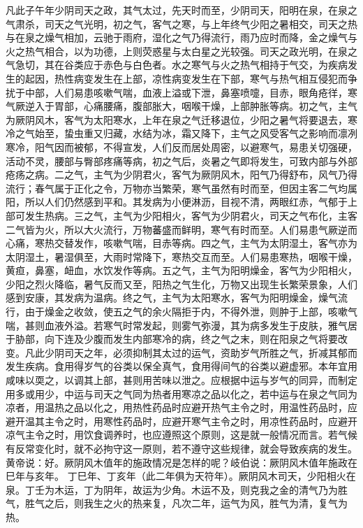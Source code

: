 \documentclass[12pt,UTF8]{ctexbook}
\begin{document}
凡此子午年少阴司天之政，其气太过，先天时而至，少阴司天，阳明在泉，在泉之气肃杀，司天之气光明，初之气，客气之寒，与上年终气少阳之暑相交，司天之热与在泉之燥气相加，云驰于雨府，湿化之气乃得流行，雨乃应时而降，金之燥气与火之热气相合，以为功德，上则荧惑星与太白星之光较强。司天之政光明，在泉之气急切，其在谷类应于赤色与白色者。水之寒气与火之热气相持于气交，为疾病发生的起因，热性病变发生在上部，凉性病变发生在下部，寒气与热气相互侵犯而争扰于中部，人们易患咳嗽气喘，血液上溢或下泄，鼻塞喷嚏，目赤，眼角疮徉，寒气厥逆入于胃部，心痛腰痛，腹部胀大，咽喉干燥，上部肿胀等病。初之气，主气为厥阴风木，客气为太阳寒水，上年在泉之气迁移退位，少阳之暑气将要退去，寒冷之气始至，蛰虫重又归藏，水结为冰，霜又降下，主气之风受客气之影响而凛冽寒冷，阳气因而被郁，不得宣发，人们反而居处周密，以避寒气，易患关切强硬，活动不灵，腰部与臀部疼痛等病，初之气后，炎暑之气即将发生，可致内部与外部疮疡之病。二之气，主气为少阴君火，客气为厥阴风木，阳气乃得舒布，风气乃得流行；春气属于正化之令，万物亦当繁荣，寒气虽然有时而至，但因主客二气均属阳，所以人们仍然感到平和。其发病为小便淋沥，目视不清，两眼红赤，气郁于上部可发生热病。三之气，主气为少阳相火，客气为少阴君火，司天之气布化，主客二气皆为火，所以大火流行，万物蕃盛而鲜明，寒气有时而至。人们易患气厥逆而心痛，寒热交替发作，咳嗽气喘，目赤等病。四之气，主气为太阴湿土，客气亦为太阴湿土，暑湿俱至，大雨时常降下，寒热交互而至。人们易患寒热，咽喉干燥，黄疸，鼻塞，衄血，水饮发作等病。五之气，主气为阳明燥金，客气为少阳相火，少阳之烈火降临，暑气反而又至，阳热之气生化，万物又出现生长繁荣景象，人们感到安康，其发病为温病。终之气，主气为太阳寒水，客气为阳明燥金，燥气流行，由于燥金之收敛，使五之气的余火隔拒于内，不得外泄，则肿于上部，咳嗽气喘，甚则血液外溢。若寒气时常发起，则雾气弥漫，其为病多发生于皮肤，雅气居于胁部，向下连及少腹而发生内部寒冷的病，终之气之末，则在阳泉之气将要改变。凡此少阴司天之年，必须抑制其太过的运气，资助岁气所胜之气，折减其郁而发生疾病。食用得岁气的谷类以保全真气，食用得间气的谷类以避虚邪。本年宜用咸味以耎之，以调其上部，甚则用苦味以泄之。应根据中运与岁气的同异，而制定用多或用少，中运与司天之气同为热者用寒凉之品以化之，若中运与在泉之气同为凉者，用温热之品以化之，用热性药品时应避开热气主令之时，用温性药品时，应避开温其主令之时，用寒性药品时，应避开寒气主令之时，用凉性药品时，应避开凉气主令之时，用饮食调养时，也应遵照这个原则，这是就一般情况而言。若气候有反常变化时，就不必拘守这一原则，若不遵守这些规律，就会导致疾病的发生。
黄帝说：好。厥阴风木值年的施政情况是怎样的呢？岐伯说：厥阴风木值年施政在巳年与亥年。
丁巳年、丁亥年（此二年俱为天符年）。厥阴风木司天，少阳相火在泉。丁壬为木运，丁为阴年，故运为少角。木运不及，则克我之金的清气乃为胜气，胜气之后，则我生之火的热来复，凡次二年，运气为风，胜气为清，复气为热。
\end{document}
